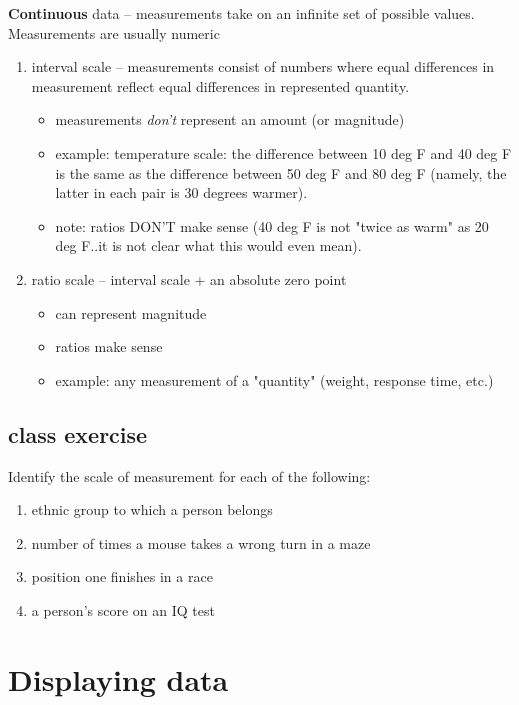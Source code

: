 \documentclass[11pt]{article}
\begin{document}
\textbf{Continuous} data -- measurements take on an infinite set of possible values.  Measurements are usually numeric
\begin{enumerate}
\item interval scale -- measurements consist of numbers where equal differences in measurement reflect equal differences in represented quantity.
\begin{itemize}
\item measurements \emph{don't} represent an amount (or magnitude)
\item example: temperature scale:  the difference between 10 deg F and 40 deg F is the same as the difference between 50 deg F and 80 deg F (namely, the latter in each pair is 30 degrees warmer).
\item note: ratios DON'T make sense (40 deg F is not "twice as warm" as 20 deg F..it is not clear what this would even mean).
\end{itemize}

\item ratio scale -- interval scale + an absolute zero point
\begin{itemize}
\item can represent magnitude
\item ratios make sense
\item example: any measurement of a "quantity" (weight, response time, etc.)
\end{itemize}
\end{enumerate}

\subsection*{class exercise}
\label{sec-2-1}

Identify the scale of measurement for each of the following:

\begin{enumerate}
\item ethnic group to which a person belongs
\item number of times a mouse takes a wrong turn in a maze
\item position one finishes in a race
\item a person's score on an IQ test
\end{enumerate}


\section*{Displaying data}
\label{sec-3}
\end{document}
